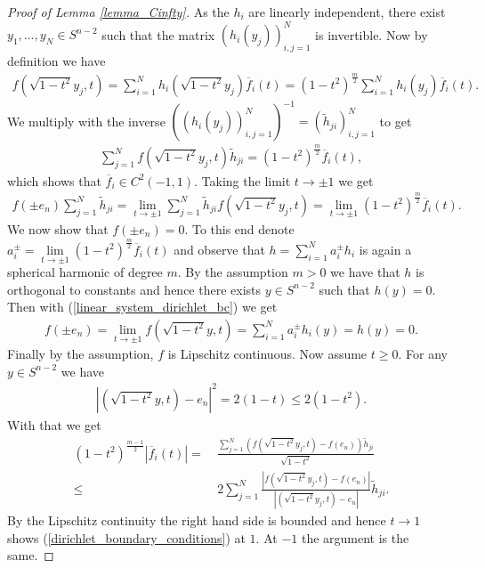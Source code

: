 \documentclass[12pt,twoside]{amsart}
\numberwithin{satz}{section}
\theoremstyle{definition}
\numberwithin{equation}{section}
\begin{document}
	\begin{proof}[Proof of Lemma \ref{lemma_Cinfty}]
		As the $h_i$ are linearly independent, there exist $y_1,\dots,y_N\in S^{n-2}$ such that the matrix $(h_i(y_j))_{i,j=1}^N$ is invertible. Now by definition we have
		\begin{align}\label{linear_system_dirichlet_bc}
			f(\sqrt{1-t^2}y_j,t)=\sum_{i=1}^N h_i(\sqrt{1-t^2}y_j)\overline{f}_i(t)=(1-t^2)^{\frac{m}{2}}\sum_{i=1}^N h_i(y_j)\overline{f}_i(t).
		\end{align}
		We multiply with the inverse $((h_i(y_j))_{i,j=1}^N)^{-1}=(\tilde{h}_{ji})_{i,j=1}^N$ to get 
		\begin{align*}
			\sum_{j=1}^N f(\sqrt{1-t^2}y_j,t) \tilde{h}_{ji}=(1-t^2)^{\frac{m}{2}} \overline{f}_i(t),
		\end{align*}
		which shows that $\overline{f}_i \in C^2(-1,1)$. Taking the limit $t\to\pm 1$ we get
		\begin{align*}
			f(\pm e_n)\sum_{j=1}^N \tilde{h}_{ji}=\lim\limits_{t\to\pm 1} \sum_{j=1}^N \tilde{h}_{ji}f(\sqrt{1-t^2}y_j,t)=\lim\limits_{t\to\pm 1}(1-t^2)^{\frac{m}{2}}\overline{f}_i(t).
		\end{align*}
		We now show that $f(\pm e_n)=0$. To this end denote $a_i^\pm=\lim\limits_{t\to\pm 1}(1-t^2)^{\frac{m}{2}}\overline{f}_i(t)$ and observe that $h=\sum_{i=1}^Na_i^\pm h_i$ is again a spherical harmonic of degree $m$. By the assumption $m>0$ we have that $h$ is orthogonal to constants and hence there exists $y\in S^{n-2}$ such that $h(y)=0$. Then with (\ref{linear_system_dirichlet_bc}) we get
		\begin{align*}
			f(\pm e_n)=\lim\limits_{t\to\pm 1} f(\sqrt{1-t^2}y,t)=\sum_{i=1}^Na_i^\pm h_i(y)=h(y)=0.
		\end{align*}
		Finally by the assumption, $f$ is Lipschitz continuous. Now assume $t\geq 0$. For any $y\in S^{n-2}$ we have
		\begin{align*}
			|(\sqrt{1-t^2}y,t)- e_n|^2=2(1-t)\leq 2(1-t^2).
		\end{align*}
		With that we get
		\begin{align*}
			(1-t^2)^{\frac{m-1}{2}}|\overline{f}_i(t)|=& \ \frac{\sum_{j=1}^N \left(f(\sqrt{1-t^2}y_j,t)-f(e_n)\right) \tilde{h}_{ji}}{\sqrt{1-t^2}} \\
			\leq & \  2\sum_{j=1}^N \frac{\left|f(\sqrt{1-t^2}y_j,t)-f(e_n)\right|}{|(\sqrt{1-t^2}y_j,t)- e_n|}\tilde{h}_{ji}.
		\end{align*}
		By the Lipschitz continuity the right hand side is bounded and hence $t\to 1$ shows (\ref{dirichlet_boundary_conditions}) at $1$. At $-1$ the argument is the same.
		

\end{proof}
\end{document}

